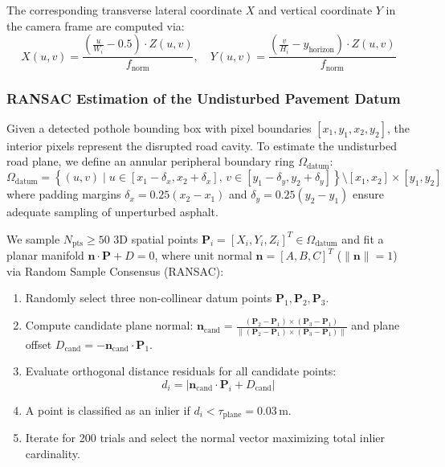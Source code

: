 The corresponding transverse lateral coordinate $X$ and vertical coordinate $Y$ in the camera frame are computed via:
\begin{equation}
    X(u, v) = \frac{\left(\frac{u}{W_i} - 0.5\right) \cdot Z(u, v)}{f_{\text{norm}}}, \quad Y(u, v) = \frac{\left(\frac{v}{H_i} - y_{\text{horizon}}\right) \cdot Z(u, v)}{f_{\text{norm}}}
    \label{eq:xy_coordinates_recon}
\end{equation}

\subsubsection{RANSAC Estimation of the Undisturbed Pavement Datum}
Given a detected pothole bounding box with pixel boundaries $[x_1, y_1, x_2, y_2]$, the interior pixels represent the disrupted road cavity. To estimate the undisturbed road plane, we define an annular peripheral boundary ring $\Omega_{\text{datum}}$:
\begin{equation}
    \Omega_{\text{datum}} = \left\{ (u, v) \mid u \in [x_1 - \delta_x, x_2 + \delta_x], \, v \in [y_1 - \delta_y, y_2 + \delta_y] \right\} \setminus [x_1, x_2] \times [y_1, y_2]
\end{equation}
where padding margins $\delta_x = 0.25(x_2 - x_1)$ and $\delta_y = 0.25(y_2 - y_1)$ ensure adequate sampling of unperturbed asphalt.

We sample $N_{\text{pts}} \ge 50$ 3D spatial points $\mathbf{P}_i = [X_i, Y_i, Z_i]^T \in \Omega_{\text{datum}}$ and fit a planar manifold $\mathbf{n} \cdot \mathbf{P} + D = 0$, where unit normal $\mathbf{n} = [A, B, C]^T$ ($\|\mathbf{n}\| = 1$) via Random Sample Consensus (RANSAC):
\begin{enumerate}
    \item Randomly select three non-collinear datum points $\mathbf{P}_1, \mathbf{P}_2, \mathbf{P}_3$.
    \item Compute candidate plane normal: $\mathbf{n}_{\text{cand}} = \frac{(\mathbf{P}_2 - \mathbf{P}_1) \times (\mathbf{P}_3 - \mathbf{P}_1)}{\|(\mathbf{P}_2 - \mathbf{P}_1) \times (\mathbf{P}_3 - \mathbf{P}_1)\|}$ and plane offset $D_{\text{cand}} = -\mathbf{n}_{\text{cand}} \cdot \mathbf{P}_1$.
    \item Evaluate orthogonal distance residuals for all candidate points:
    \begin{equation}
        d_i = \left| \mathbf{n}_{\text{cand}} \cdot \mathbf{P}_i + D_{\text{cand}} \right|
    \end{equation}
    \item A point is classified as an inlier if $d_i < \tau_{\text{plane}} = 0.03\,\text{m}$.
    \item Iterate for 200 trials and select the normal vector maximizing total inlier cardinality.
\end{enumerate}

